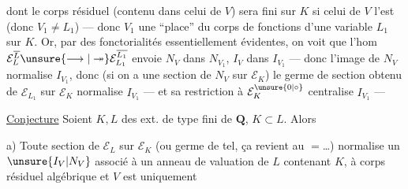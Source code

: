 dont le corps résiduel (contenu dans celui de
$V$) sera  fini sur $K$ si celui de $V$
l'est (donc $V_1\ne L_1$) --- donc $V_1$ \deleted{$\longrightarrow$}  une
``place'' du corps de fonctions d'une variable
$L_1$ sur $K$. Or, par des fonctorialités
essentiellement évidentes, on voit que
l'hom $\mathcal E_L^{\overline L}\unsure{\longrightarrow|\twoheadrightarrow}\mathcal E_{L_1}^{\overline{L_1}}$ envoie $N_V$ dans $N_{V_1}$,
$I_V$ dans $I_{V_1}$ --- donc l'image de $N_V$
normalise $I_{V_1}$, donc (si on a une  section
de $N_V$ sur $\mathcal E_K$) le germe de section
obtenu de $\mathcal E_{L_1}$ sur $\mathcal E_K$ normalise $I_{V_1}$
--- et sa restriction à $\mathcal E_K^{\unsure{0|\circ}}$ centralise
$I_{V_1}$ ---

\uline{Conjecture} Soient $K,L$ des ext. de
type fini de $\mathbf Q$, $K\subset L$. Alors

a) Toute section de $\mathcal E_L$ sur $\mathcal E_K$
(ou germe de tel, ça revient au $=$\ldots)
normalise un $\unsure{I_V|N_V}$ associé à un anneau
de valuation  de $L$ contenant $K$, à corps
résiduel algébrique  \deleted{\unsure{,}} et  $V$ est uniquement
